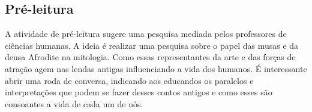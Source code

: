 \documentclass[12pt]{extarticle}
\begin{document}



\subsection{Pré-leitura}

 A atividade de pré-leitura sugere uma pesquisa mediada pelos professores de
 ciências humanas. A ideia é realizar uma pesquisa sobre o papel das musas e da
 deusa Afrodite na mitologia. Como essas representantes da arte e das forças de
 atração agem nas lendas antigas influenciando a vida dos humanos. É
 interessante abrir uma roda de conversa, indicando aos educandos os paralelos
 e interpretações que podem se fazer desses contos antigos e como esses são
 consoantes a vida de cada um de nós.


 
 




\end{document}
